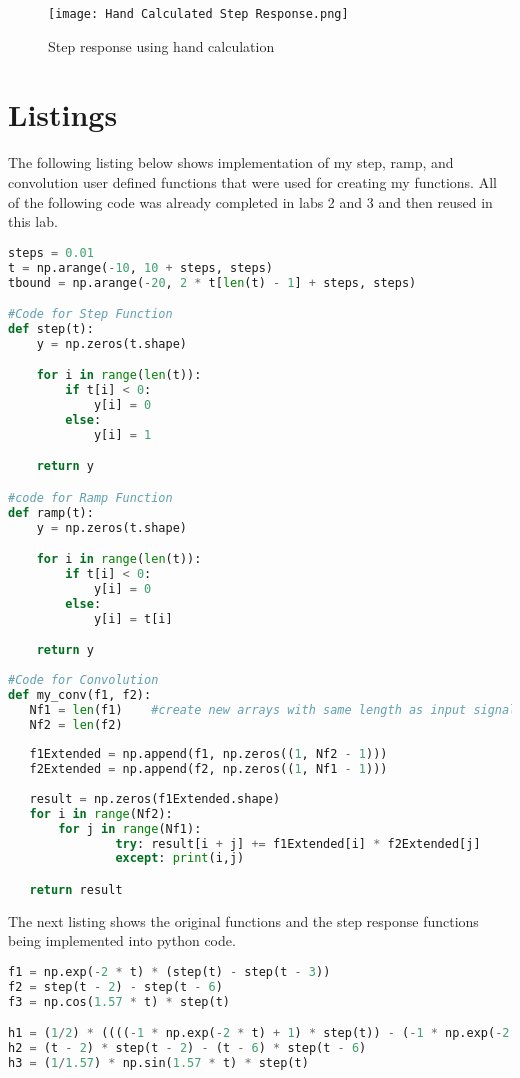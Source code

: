 \documentclass[12pt]{report}
\begin{document}
\begin{figure}[h!]
    \centering
    \texttt{[image: Hand Calculated Step Response.png]}
    \caption{Step response using hand calculation}
    \label{Figure x:}
\end{figure}

\section{Listings}
\hspace{\parindent}The following listing below shows implementation of my step, ramp, and convolution user defined functions that were used for creating my functions. All of the following code was already completed in labs 2 and 3 and then reused in this lab.
\begin{lstlisting}[language=Python, caption=Convolution Function]
steps = 0.01
t = np.arange(-10, 10 + steps, steps)
tbound = np.arange(-20, 2 * t[len(t) - 1] + steps, steps)

#Code for Step Function
def step(t):
    y = np.zeros(t.shape)

    for i in range(len(t)):
        if t[i] < 0:
            y[i] = 0
        else:
            y[i] = 1

    return y

#code for Ramp Function
def ramp(t):
    y = np.zeros(t.shape)

    for i in range(len(t)):
        if t[i] < 0:
            y[i] = 0
        else:
            y[i] = t[i]

    return y
    
#Code for Convolution
def my_conv(f1, f2):
   Nf1 = len(f1)    #create new arrays with same length as input signals
   Nf2 = len(f2)
   
   f1Extended = np.append(f1, np.zeros((1, Nf2 - 1)))                                                  
   f2Extended = np.append(f2, np.zeros((1, Nf1 - 1)))
   
   result = np.zeros(f1Extended.shape)
   for i in range(Nf2):     
       for j in range(Nf1): 
               try: result[i + j] += f1Extended[i] * f2Extended[j]
               except: print(i,j)

   return result
\end{lstlisting}
\hspace{\parindent}The next listing shows the original functions and the step response functions being implemented into python code.
\begin{lstlisting}[language=Python, caption=Convolution Function]
f1 = np.exp(-2 * t) * (step(t) - step(t - 3))
f2 = step(t - 2) - step(t - 6)
f3 = np.cos(1.57 * t) * step(t) 

h1 = (1/2) * ((((-1 * np.exp(-2 * t) + 1) * step(t)) - (-1 * np.exp(-2 * (t - 3)) + 1) * step(t -  3)))
h2 = (t - 2) * step(t - 2) - (t - 6) * step(t - 6)
h3 = (1/1.57) * np.sin(1.57 * t) * step(t)
\end{lstlisting}
\end{document}
